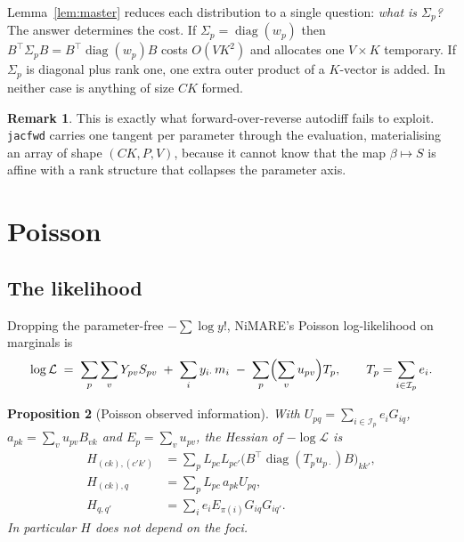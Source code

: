 \documentclass[11pt,a4paper]{article}
\theoremstyle{plain}
\newtheorem{proposition}{Proposition}
\theoremstyle{definition}
\newtheorem{remark}[proposition]{Remark}
\newcommand{\E}{\mathcal{I}}
\newcommand{\diag}{\operatorname{diag}}
\begin{document}
Lemma~\ref{lem:master} reduces each distribution to a single question: \emph{what is $\Sigma_p$?}
The answer determines the cost. If $\Sigma_p = \diag(w_p)$ then
$B^\top \Sigma_p B = B^\top \diag(w_p) B$ costs $O(VK^2)$ and allocates one $V \times K$
temporary. If $\Sigma_p$ is diagonal plus rank one, one extra outer product of a
$K$-vector is added. In neither case is anything of size $CK$ formed.

\begin{remark}
This is exactly what forward-over-reverse autodiff fails to exploit. \texttt{jacfwd} carries one
tangent per parameter through the evaluation, materialising an array of shape $(CK, P, V)$,
because it cannot know that the map $\beta \mapsto S$ is affine with a rank structure that
collapses the parameter axis.
\end{remark}

\section{Poisson}

\subsection{The likelihood}

Dropping the parameter-free $-\sum \log y!$, NiMARE's Poisson log-likelihood on marginals is
\begin{equation}\label{eq:poisson-ll}
  \log\mathcal{L} \;=\; \sum_{p}\sum_{v} Y_{pv} S_{pv}
  \;+\; \sum_{i} y_{i\cdot}\, m_i
  \;-\; \sum_{p} \Bigl(\sum_v u_{pv}\Bigr) T_p,
  \qquad T_p = \sum_{i \in \E_p} e_i .
\end{equation}

\begin{proposition}[Poisson observed information]\label{prop:poisson}
With $U_{pq} = \sum_{i\in\E_p} e_i G_{iq}$, $a_{pk} = \sum_v u_{pv}B_{vk}$ and
$E_p = \sum_v u_{pv}$, the Hessian of $-\log\mathcal{L}$ is
\begin{align}
  H_{(ck),(c'k')} &= \sum_p L_{pc}L_{pc'} \bigl(B^\top \diag(T_p u_{p\cdot}) B\bigr)_{kk'},\\
  H_{(ck),q} &= \sum_p L_{pc}\, a_{pk} U_{pq},\\
  H_{q,q'} &= \sum_i e_i E_{\pi(i)} G_{iq}G_{iq'} .
\end{align}
In particular $H$ does not depend on the foci.
\end{proposition}
\end{document}
